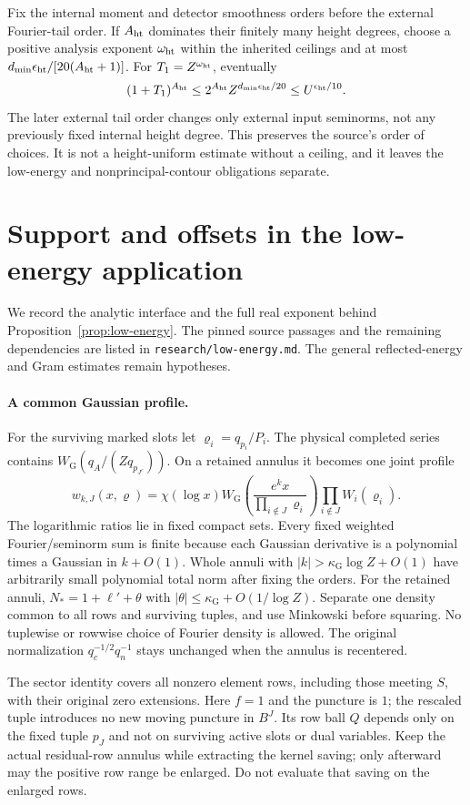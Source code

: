 Fix the internal moment and detector smoothness orders before the
external Fourier-tail order. If $A_{\rm ht}$ dominates their finitely
many height degrees, choose a positive analysis exponent $\omega_{\rm ht}$
within the inherited ceilings and at most
$d_{\min}\epsilon_{\rm ht}/[20(A_{\rm ht}+1)]$.
For $T_1=Z^{\omega_{\rm ht}}$, eventually
\[
 (1+T_1)^{A_{\rm ht}}
 \le2^{A_{\rm ht}}Z^{d_{\min}\epsilon_{\rm ht}/20}
 \le U^{\epsilon_{\rm ht}/10}.
\]
The later external tail order changes only external input seminorms,
not any previously fixed internal height degree. This preserves the
source's order of choices. It is not a height-uniform estimate without
a ceiling, and it leaves the low-energy and nonprincipal-contour
obligations separate.


\section{Support and offsets in the low-energy application}
We record the analytic interface and the full real exponent behind
Proposition~\ref{prop:low-energy}. The pinned source passages and the
remaining dependencies are listed in \texttt{research/low-energy.md}.
The general reflected-energy and Gram estimates remain hypotheses.

\paragraph{A common Gaussian profile.}
For the surviving marked slots let $\varrho_i=q_{p_i}/P_i$.
The physical completed series contains
$W_{\mathrm G}(q_A/(Zq_{p_{J^c}}))$. On a retained annulus it becomes
one joint profile
\[
 w_{k,J}(x,\boldsymbol\varrho)
 =\chi(\log x)W_{\mathrm G}\!\left(
       \frac{e^kx}{\prod_{i\notin J}\varrho_i}\right)
       \prod_{i\notin J}W_i(\varrho_i).
\]
The logarithmic ratios lie in fixed compact sets. Every fixed weighted
Fourier/seminorm sum is finite because each Gaussian derivative is a
polynomial times a Gaussian in $k+O(1)$. Whole annuli with
$|k|>\kappa_{\mathrm G}\log Z+O(1)$ have arbitrarily small polynomial
total norm after fixing the orders. For the retained annuli,
$N_*=1+\ell'+\theta$ with
$|\theta|\le\kappa_{\mathrm G}+O(1/\log Z)$.
Separate one density common to all rows and surviving tuples, and use
Minkowski before squaring. No tuplewise or rowwise choice of Fourier
density is allowed. The original normalization $q_c^{-1/2}q_n^{-1}$
stays unchanged when the annulus is recentered.

The sector identity covers all nonzero element rows, including those
meeting $S$, with their original zero extensions. Here $f=1$ and the
puncture is $1$; the rescaled tuple introduces no new moving puncture
in $B^J$. Its row ball $Q$ depends only on the fixed tuple $p_J$ and
not on surviving active slots or dual variables. Keep the actual
residual-row annulus while extracting the kernel saving; only afterward
may the positive row range be enlarged. Do not evaluate that saving
on the enlarged rows.

